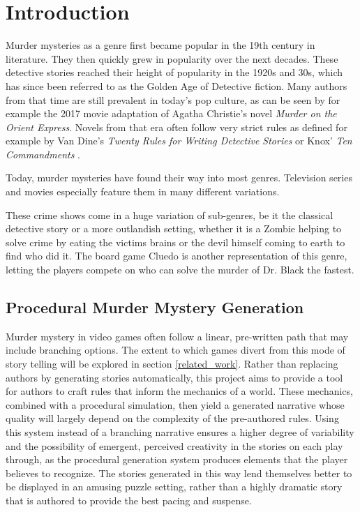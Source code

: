\section{Introduction} \label{introduction}

Murder mysteries as a genre first became popular in the 19th century in literature.
They then quickly grew in popularity over the next decades.
These detective stories reached their height of popularity in the 1920s and 30s, which has since been referred to as the Golden Age of Detective fiction.
Many authors from that time are still prevalent in today's pop culture, as can be seen by for example the 2017 movie adaptation of Agatha Christie's novel \emph{Murder on the Orient Express}.
Novels from that era often follow very strict rules as defined for example by Van Dine's \emph{Twenty Rules for Writing Detective Stories} or Knox' \emph{Ten Commandments} \cite{van_dine_1928, knox_1929}.

Today, murder mysteries have found their way into most genres.
Television series and movies especially feature them in many different variations.

These crime shows come in a huge variation of sub-genres, be it the classical detective story or a more outlandish setting, whether it is a Zombie helping to solve crime by eating the victims brains or the devil himself coming to earth to find who did it. 
The board game Cluedo is another representation of this genre, letting the players compete on who can solve the murder of Dr. Black the fastest.

\subsection{Procedural Murder Mystery Generation} 
Murder mystery in video games often follow a linear, pre-written path that may include branching options.
The extent to which games divert from this mode of story telling will be explored in section \ref{related_work}.
Rather than replacing authors by generating stories automatically, this project aims to provide a tool for authors to craft rules that inform the mechanics of a world.
These mechanics, combined with a procedural simulation, then yield a generated narrative whose quality will largely depend on the complexity of the pre-authored rules.
Using this system instead of a branching narrative ensures a higher degree of variability and the possibility of emergent, perceived creativity in the stories on each play through, as the procedural generation system produces elements that the player believes to recognize.
The stories generated in this way lend themselves better to be displayed in an amusing puzzle setting, rather than a highly dramatic story that is authored to provide the best pacing and suspense.

